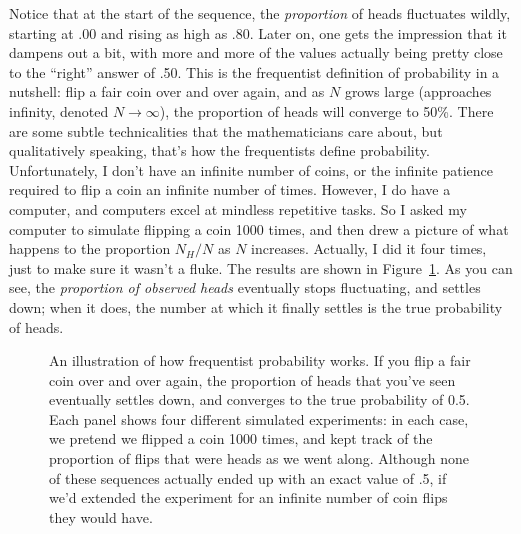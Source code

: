 Notice that at the start of the sequence, the {\it proportion} of heads fluctuates wildly, starting at .00 and rising as high as .80. Later on, one gets the impression that it dampens out a bit, with more and more of the values actually being pretty close to the ``right'' answer of .50. This is the frequentist definition of probability in a nutshell: flip a fair coin over and over again, and as $N$ grows large (approaches infinity, denoted $N\rightarrow \infty$), the proportion of heads will converge to 50\%. There are some subtle technicalities that the mathematicians care about, but qualitatively speaking, that's how the frequentists define probability. Unfortunately, I don't have an infinite number of coins, or the infinite patience required to flip a coin an infinite number of times. However, I do have a computer, and computers excel at mindless repetitive tasks. So I asked my computer to simulate flipping a coin 1000 times, and then drew a picture of what happens to the proportion $N_H / N$ as $N$ increases. Actually, I did it four times, just to make sure it wasn't a fluke. The results are shown in Figure~\ref{fig:frequentistprobability}. As you can see, the {\it proportion of observed heads} eventually stops fluctuating, and settles down; when it does, the number at which it finally settles is the true probability of heads.


\begin{figure}[p]
\begin{center}
\caption{An illustration of how frequentist probability works. If you flip a fair coin over and over again, the proportion of heads that you've seen eventually settles down, and converges to the true probability of 0.5. Each panel shows four different simulated experiments: in each case, we pretend we flipped a coin 1000 times, and kept track of the proportion of flips that were heads as we went along. Although none of these sequences actually ended up with an exact value of .5, if we'd extended the experiment for an infinite number of coin flips they would have.}
\label{fig:frequentistprobability}
\HR
\end{center}
\end{figure}


